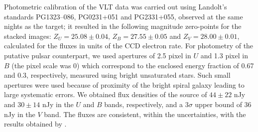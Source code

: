 \documentclass[pdftex,twocolumn]{aastex62}
\newcommand{\va}[1]{{\color[rgb]{1.0,0.0,0.0}VA: #1}}
\begin{document}
Photometric calibration of the VLT data was carried out using Landolt's standards PG1323--086, PG0231+051 and PG2331+055, observed at the same nights as the target; it resulted in the following  magnitude zero-points for the stacked images: $Z_U=25.08\pm0.04$,  $Z_B=27.55\pm0.05$ and $Z_V=28.00\pm0.01$,  
%
calculated for the fluxes in units of the CCD electron rate.  
For photometry of the putative pulsar counterpart, we used apertures of 2.5 pixel in $U$ and 1.3 pixel  in $B$ (the pixel scale was 0) which correspond to the enclosed energy fraction of 0.67 and 0.3, respectively, measured using 
bright unsaturated stars.
Such small apertures were used 
because of proximity of the bright spiral galaxy leading  to large systematic errors. We obtained  flux densities of the source of $44\pm22$ nJy   and $30\pm14$ nJy in the $U$ and $B$ bands, respectively, and a $3\sigma$ upper bound of 36 nJy in the $V$ band.  
The fluxes are consistent, within the uncertainties,
with the results obtained by \cite{Mignani2008}. 
\end{document}
